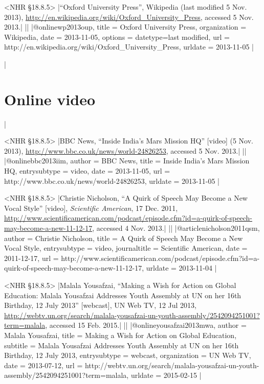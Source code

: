 \documentclass[extrafontsizes,11pt,a4paper,oneside]{memoir}
\begin{document}
\bibexample<NHR \S18.8.5>
|\enquote{Oxford University Press}, Wikipedia (last modified 5 Nov. 2013), \url{http://en.wikipedia.org/wiki/Oxford_University_Press}, accessed 5 Nov. 2013.|%
||%
|@online{wp2013oup,
  title = {Oxford University Press},
  organization = {Wikipedia},
  date = {2013-11-05},
  options = {datetype={last modified}},
  url = {http://en.wikipedia.org/wiki/Oxford_University_Press},
  urldate = {2013-11-05}
}|

\todoc|
\section{Online video}
|

\bibexample<NHR \S18.8.5>
|BBC News, \enquote{Inside India's Mars Mission HQ} [video] (5 Nov. 2013), \url{http://www.bbc.co.uk/news/world-24826253}, accessed 5 Nov. 2013.|%
||%
|@online{bbc2013iim,
  author = {{BBC News}},
  title = {Inside India's Mars Mission HQ},
  entrysubtype = {video},
  date = {2013-11-05},
  url = {http://www.bbc.co.uk/news/world-24826253},
  urldate = {2013-11-05}
}|

\bibexample<NHR \S18.8.5>
|Christie Nicholson, \enquote{A Quirk of Speech May Become a New Vocal Style} [video], \emph{Scientific American}, 17 Dec. 2011, \url{http://www.scientificamerican.com/podcast/episode.cfm?id=a-quirk-of-speech-may-become-a-new-11-12-17}, accessed 4 Nov. 2013.|%
||
|@article{nicholson2011qsm,
  author = {Christie Nicholson},
  title = {A Quirk of Speech May Become a New Vocal Style},
  entrysubtype = {video},
  journaltitle = {Scientific American},
  date = {2011-12-17},
  url = {http://www.scientificamerican.com/podcast/episode.cfm?id=a-quirk-of-speech-may-become-a-new-11-12-17},
  urldate = {2013-11-04}
}|

\bibexample<NHR \S18.8.5>
|Malala Yousafzai, \enquote{Making a Wish for Action on Global Education: Malala Yousafzai Addresses Youth Assembly at UN on her 16th Birthday, 12 July 2013} [webcast], UN Web TV, 12 Jul 2013, \url{http://webtv.un.org/search/malala-yousafzai-un-youth-assembly/2542094251001?term=malala}, accessed 15 Feb. 2015.|%
||%
|@online{yousafzai2013mwa,
  author = {Malala Yousafzai},
  title = {Making a Wish for Action on Global Education},
  subtitle = {Malala Yousafzai Addresses Youth Assembly at UN on her 16th Birthday, 12 July 2013},
  entrysubtype = {webcast},
  organization = {UN Web TV},
  date = {2013-07-12},
  url = {http://webtv.un.org/search/malala-yousafzai-un-youth-assembly/2542094251001?term=malala},
  urldate = {2015-02-15}
}|
\end{document}
